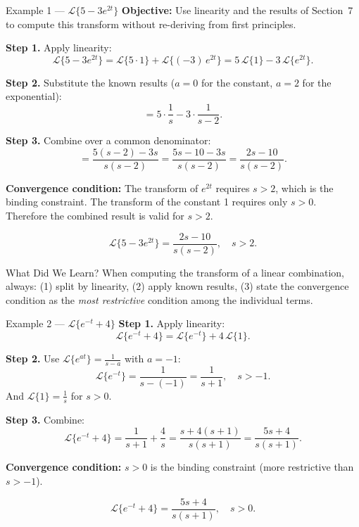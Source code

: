 \documentclass[12pt,a4paper]{article}
\begin{document}
\begin{infobox}{Example 1 --- $\mathcal{L}\{5 - 3e^{2t}\}$}
\textbf{Objective:} Use linearity and the results of Section~7 to compute this
transform without re-deriving from first principles.

\medskip
\textbf{Step 1.} Apply linearity:
\[
  \mathcal{L}\{5 - 3e^{2t}\}
  = \mathcal{L}\{5 \cdot 1\} + \mathcal{L}\{(-3)\,e^{2t}\}
  = 5\,\mathcal{L}\{1\} - 3\,\mathcal{L}\{e^{2t}\}.
\]

\textbf{Step 2.} Substitute the known results ($a = 0$ for the constant, $a = 2$ for the exponential):
\[
  = 5 \cdot \frac{1}{s} - 3 \cdot \frac{1}{s - 2}.
\]

\textbf{Step 3.} Combine over a common denominator:
\[
  = \frac{5(s-2) - 3s}{s(s-2)}
  = \frac{5s - 10 - 3s}{s(s-2)}
  = \frac{2s - 10}{s(s-2)}.
\]

\textbf{Convergence condition:} The transform of $e^{2t}$ requires $s > 2$,
which is the binding constraint. The transform of the constant 1 requires
only $s > 0$. Therefore the combined result is valid for $s > 2$.

\[
  \boxed{\mathcal{L}\{5 - 3e^{2t}\} = \frac{2s-10}{s(s-2)}, \quad s > 2.}
\]
\end{infobox}

\begin{learnbox}{What Did We Learn?}
When computing the transform of a linear combination, always: (1) split by
linearity, (2) apply known results, (3) state the convergence condition as the
\emph{most restrictive} condition among the individual terms.
\end{learnbox}

\begin{infobox}{Example 2 --- $\mathcal{L}\{e^{-t} + 4\}$}
\textbf{Step 1.} Apply linearity:
\[
  \mathcal{L}\{e^{-t} + 4\}
  = \mathcal{L}\{e^{-t}\} + 4\,\mathcal{L}\{1\}.
\]

\textbf{Step 2.} Use $\mathcal{L}\{e^{at}\} = \tfrac{1}{s-a}$ with $a = -1$:
\[
  \mathcal{L}\{e^{-t}\} = \frac{1}{s-(-1)} = \frac{1}{s+1}, \quad s > -1.
\]
And $\mathcal{L}\{1\} = \tfrac{1}{s}$ for $s > 0$.

\textbf{Step 3.} Combine:
\[
  \mathcal{L}\{e^{-t} + 4\}
  = \frac{1}{s+1} + \frac{4}{s}
  = \frac{s + 4(s+1)}{s(s+1)}
  = \frac{5s + 4}{s(s+1)}.
\]

\textbf{Convergence condition:} $s > 0$ is the binding constraint (more
restrictive than $s > -1$).

\[
  \boxed{\mathcal{L}\{e^{-t} + 4\} = \frac{5s+4}{s(s+1)}, \quad s > 0.}
\]
\end{infobox}
\end{document}
